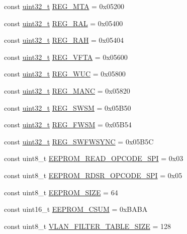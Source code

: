 \begin{DoxyCompactItemize}
\item 
const \hyperlink{Type_8hh_a435d1572bf3f880d55459d9805097f62}{uint32\_\-t} \hyperlink{namespaceiGbReg_a9180502721e1193be91b79b98c3f40cf}{REG\_\-MTA} = 0x05200
\item 
const \hyperlink{Type_8hh_a435d1572bf3f880d55459d9805097f62}{uint32\_\-t} \hyperlink{namespaceiGbReg_a9e6308c54a1c811135394041894921da}{REG\_\-RAL} = 0x05400
\item 
const \hyperlink{Type_8hh_a435d1572bf3f880d55459d9805097f62}{uint32\_\-t} \hyperlink{namespaceiGbReg_afbf8013fc467361c016303bdeeab4255}{REG\_\-RAH} = 0x05404
\item 
const \hyperlink{Type_8hh_a435d1572bf3f880d55459d9805097f62}{uint32\_\-t} \hyperlink{namespaceiGbReg_a36fae451371a57470da74bf7a9123d80}{REG\_\-VFTA} = 0x05600
\item 
const \hyperlink{Type_8hh_a435d1572bf3f880d55459d9805097f62}{uint32\_\-t} \hyperlink{namespaceiGbReg_ae38d313c67812ad08bb3cd17222ab977}{REG\_\-WUC} = 0x05800
\item 
const \hyperlink{Type_8hh_a435d1572bf3f880d55459d9805097f62}{uint32\_\-t} \hyperlink{namespaceiGbReg_add1b433d6b59293827d8b1243c113ff7}{REG\_\-MANC} = 0x05820
\item 
const \hyperlink{Type_8hh_a435d1572bf3f880d55459d9805097f62}{uint32\_\-t} \hyperlink{namespaceiGbReg_a8ebb03ad73bb087733a50473e2aa812f}{REG\_\-SWSM} = 0x05B50
\item 
const \hyperlink{Type_8hh_a435d1572bf3f880d55459d9805097f62}{uint32\_\-t} \hyperlink{namespaceiGbReg_a80005f52855fb630c17c4da9971ef2fc}{REG\_\-FWSM} = 0x05B54
\item 
const \hyperlink{Type_8hh_a435d1572bf3f880d55459d9805097f62}{uint32\_\-t} \hyperlink{namespaceiGbReg_a4ee74c9ae8abd7bb42d2d7c6a5d4ed1f}{REG\_\-SWFWSYNC} = 0x05B5C
\item 
const uint8\_\-t \hyperlink{namespaceiGbReg_a58a0832d5420b8f5624fcb7f29eaa638}{EEPROM\_\-READ\_\-OPCODE\_\-SPI} = 0x03
\item 
const uint8\_\-t \hyperlink{namespaceiGbReg_a5327659659ed1abd6db6bf00e9b74746}{EEPROM\_\-RDSR\_\-OPCODE\_\-SPI} = 0x05
\item 
const uint8\_\-t \hyperlink{namespaceiGbReg_adb0e1024d46141c966014951f5b1e5c8}{EEPROM\_\-SIZE} = 64
\item 
const uint16\_\-t \hyperlink{namespaceiGbReg_a1860fbe30f4a9e9a36847405cf7ed5d9}{EEPROM\_\-CSUM} = 0xBABA
\item 
const uint8\_\-t \hyperlink{namespaceiGbReg_a9678c7045c653e90c096e22638cd9b56}{VLAN\_\-FILTER\_\-TABLE\_\-SIZE} = 128

\end{DoxyCompactItemize}
